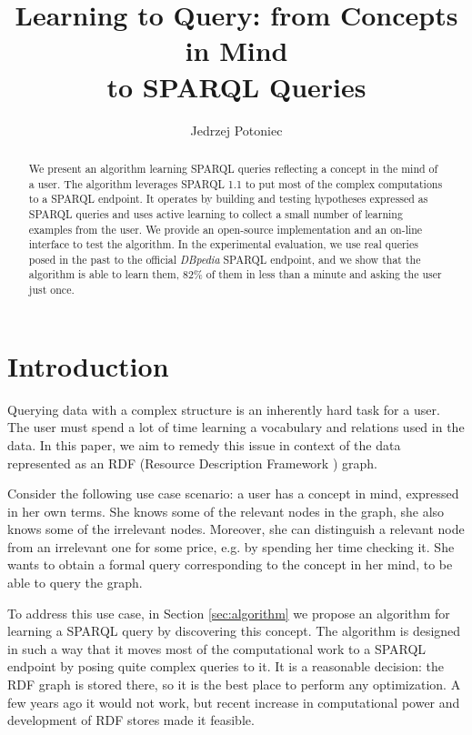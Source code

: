 \documentclass{llncs}
\title{Learning to Query: from Concepts in Mind\\to SPARQL Queries}
\author{Jedrzej Potoniec}
\institute{Faculty of Computing, Poznan University of Technology\\ul. Piotrowo 3, 60-965 Poznan, Poland \\\email{Jedrzej.Potoniec@cs.put.poznan.pl}}
\begin{document}
\maketitle

\begin{abstract}
We present an algorithm learning SPARQL queries reflecting a concept in the mind of a user.
The algorithm leverages SPARQL 1.1 to put most of the complex computations to a SPARQL endpoint.
It operates by building and testing hypotheses expressed as SPARQL queries and uses active learning to collect a small number of learning examples from the user.
We provide an open-source implementation and an on-line interface to test the algorithm.
In the experimental evaluation, we use real queries posed in the past to the official \emph{DBpedia} SPARQL endpoint, and we show that the algorithm is able to learn them, 82\% of them in less than a minute and asking the user just once.
\end{abstract}

\section{Introduction}

Querying data with a complex structure is an inherently hard task for a user.
The user must spend a lot of time learning a vocabulary and relations used in the data.
In this paper, we aim to remedy this issue in context of the data represented as an RDF (Resource Description Framework  \cite{Wood:14:RCA}) graph.

Consider the following use case scenario: a user has a concept in mind, expressed in her own terms.
She knows some of the relevant nodes in the graph, she also knows some of the irrelevant nodes.
Moreover, she can distinguish a relevant node from an irrelevant one for some price, e.g. by spending her time checking it.
She wants to obtain a formal query corresponding to the concept in her mind, to be able to query the graph.

To address this use case, in Section \ref{sec:algorithm} we propose an algorithm for learning a SPARQL \cite{Harris:13:SQL} query by discovering this concept.
The algorithm is designed in such a way that it moves most of the computational work to a SPARQL endpoint by posing quite complex queries to it.
It is a reasonable decision: the RDF graph is stored there, so it is the best place to perform any optimization.
A few years ago it would not work, but recent increase in computational power and development of RDF stores made it feasible.
\end{document}
